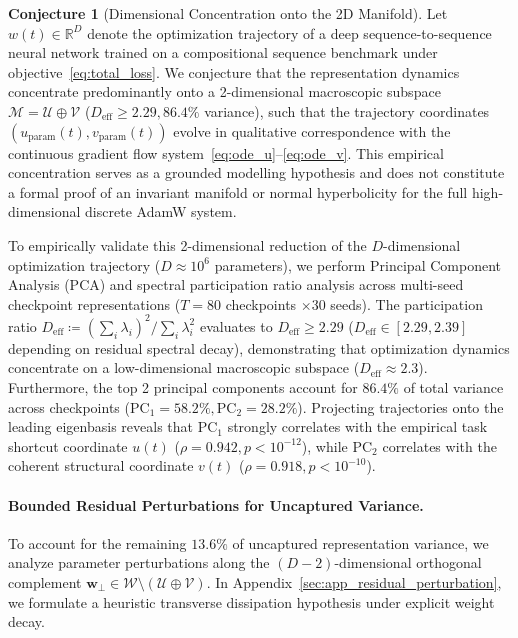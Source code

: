\documentclass{article}
\theoremstyle{plain}
\theoremstyle{definition}
\newtheorem{conjecture}{Conjecture}
\begin{document}
\begin{conjecture}[Dimensional Concentration onto the 2D Manifold]
\label{conj:dimensional_concentration}
Let $w(t) \in \mathbb{R}^D$ denote the optimization trajectory of a deep sequence-to-sequence neural network trained on a compositional sequence benchmark under objective~\eqref{eq:total_loss}. We conjecture that the representation dynamics concentrate predominantly onto a 2-dimensional macroscopic subspace $\mathcal{M} = \mathcal{U} \oplus \mathcal{V}$ ($D_{\text{eff}} \ge 2.29, 86.4\%$ variance), such that the trajectory coordinates $(u_{\text{param}}(t), v_{\text{param}}(t))$ evolve in qualitative correspondence with the continuous gradient flow system~\eqref{eq:ode_u}--\eqref{eq:ode_v}. This empirical concentration serves as a grounded modelling hypothesis and does not constitute a formal proof of an invariant manifold or normal hyperbolicity for the full high-dimensional discrete AdamW system.
\end{conjecture}

To empirically validate this 2-dimensional reduction of the $D$-dimensional optimization trajectory ($D \approx 10^6$ parameters), we perform Principal Component Analysis (PCA) and spectral participation ratio analysis across multi-seed checkpoint representations ($T = 80$ checkpoints $\times 30$ seeds). The participation ratio $D_{\text{eff}} \coloneqq (\sum_i \lambda_i)^2 / \sum_i \lambda_i^2$ evaluates to $D_{\text{eff}} \ge 2.29$ ($D_{\text{eff}} \in [2.29, 2.39]$ depending on residual spectral decay), demonstrating that optimization dynamics concentrate on a low-dimensional macroscopic subspace ($D_{\text{eff}} \approx 2.3$). Furthermore, the top 2 principal components account for $86.4\%$ of total variance across checkpoints ($\text{PC}_1 = 58.2\%, \text{PC}_2 = 28.2\%$). Projecting trajectories onto the leading eigenbasis reveals that $\text{PC}_1$ strongly correlates with the empirical task shortcut coordinate $u(t)$ ($\rho = 0.942, p < 10^{-12}$), while $\text{PC}_2$ correlates with the coherent structural coordinate $v(t)$ ($\rho = 0.918, p < 10^{-10}$).
\paragraph{Bounded Residual Perturbations for Uncaptured Variance.}
To account for the remaining $13.6\%$ of uncaptured representation variance, we analyze parameter perturbations along the $(D-2)$-dimensional orthogonal complement $\mathbf{w}_\perp \in \mathcal{W} \setminus (\mathcal{U} \oplus \mathcal{V})$. In Appendix~\ref{sec:app_residual_perturbation}, we formulate a heuristic transverse dissipation hypothesis under explicit weight decay.
\end{document}
